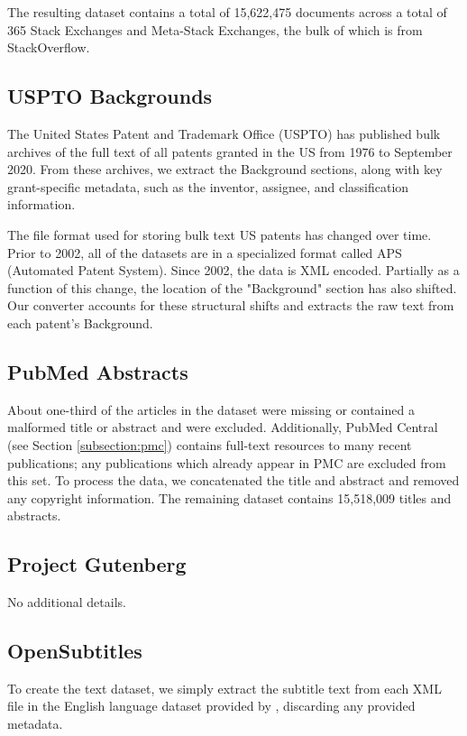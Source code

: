 \documentclass[11pt,a4paper]{article}
\begin{document}
\begin{appendices}
The resulting dataset contains a total of 15,622,475 documents across a total of 365 Stack Exchanges and Meta-Stack Exchanges, the bulk of which is from StackOverflow.

\subsection{USPTO Backgrounds}

The United States Patent and Trademark Office (USPTO) has published bulk archives of the full text of all patents granted in the US from 1976 to September 2020. From these archives, we extract the Background sections, along with key grant-specific metadata, such as the inventor, assignee, and classification information.

The file format used for storing bulk text US patents has changed over time. Prior to 2002, all of the datasets are in a specialized format called APS (Automated Patent System). Since 2002, the data is XML encoded. Partially as a function of this change, the location of the "Background" section has also shifted. Our converter accounts for these structural shifts and extracts the raw text from each patent's Background.

\subsection{PubMed Abstracts}

About one-third of the articles in the dataset were missing or contained a malformed title or abstract and were excluded. Additionally, PubMed Central (see Section \ref{subsection:pmc}) contains full-text resources to many recent publications; any publications which already appear in PMC are excluded from this set. To process the data, we concatenated the title and abstract and removed any copyright information. The remaining dataset contains 15,518,009 titles and abstracts.

\subsection{Project Gutenberg}

No additional details.

\subsection{OpenSubtitles}

To create the text dataset, we simply extract the subtitle text from each XML file in the English language dataset provided by \citet{OpenSubtitles}, discarding any provided metadata.


\end{appendices}
\end{document}
